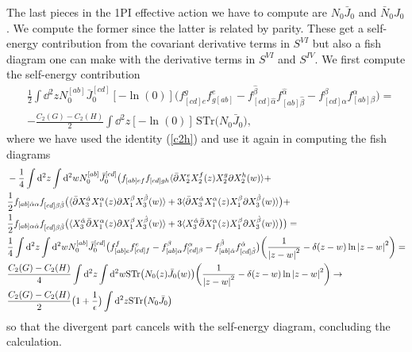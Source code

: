 \documentclass[12pt]{article}
\def\be{\begin{equation}}
\def\ee{\end{equation}}
\numberwithin{equation}{section}
\newcommand{\h}[1]{\hat{#1}}
\begin{document}
The last pieces in the 1PI effective action we have to compute are $N_0\bar{J}_0$ and $\bar{N}_0 J_0$. We compute the former since the latter is related by parity. These get a self-energy contribution from the covariant derivative terms in $S^{VI}$ but also a fish diagram one can make with the derivative terms in $S^{VI}$ and $S^{IV}$. We first compute the self-energy contribution
\be
\begin{aligned}
&\frac{1}{2}\int \dd^2z N_0^{[ab]}\bar{J}_0^{[cd]}[-\ln(0)]\big(f_{[cd]e}^g f^e_{g[ab]} - f_{[cd]\h{\alpha}}^{\h{\beta}} f_{[ab]\h{\beta}}^{\h{\alpha}} - f_{[cd]\alpha}^\beta f_{[ab]\beta}^\alpha\big) = \\
&-\frac{C_2(G)-C_2(H)}{2} \int \dd^2 z [-\ln(0)] \,\text{STr} \big(N_0 \bar{J}_0\big),
\end{aligned}
\ee
where we have used the identity (\ref{c2h}) and use it again in computing the fish diagrams
\be
\begin{aligned}
&-\frac{1}{4}\int \dd^2 z \int \dd^2 w N_0^{[ab]} \bar{J}_0^{[cd]} \big(f_{[ab]ef}f_{[cd]gh} \langle \bar{\partial} X_2^e X_2^f(z) X_2^g \partial X_2^h(w)\rangle + \\
& \frac{1}{2} f_{[ab]\h{\alpha}\alpha}f_{[cd]\beta \h{\beta}} \big(\langle \bar{\partial} X_3^{\h{\alpha} }X_1^\alpha(z) \partial X_1^\beta X_3^{\h{\beta}}(w)\rangle + 3 \langle \bar{\partial} X_3^{\h{\alpha}} X_1^\alpha(z) X_1^\beta \partial X_3^{\h{\beta}}(w)\rangle \big) + \\
&\frac{1}{2}  f_{[ab]\alpha\h{\alpha}}f_{[cd]\beta \h{\beta}} \big(\langle X_3^{\h{\alpha}}\bar{\partial}X_1^\alpha(z) \partial X_1^\beta X_3^{\h{\beta}}(w)\rangle + 3 \langle X_3^{\h{\alpha}}\bar{\partial}X_1^\alpha(z)  X_1^\beta\partial X_3^{\h{\beta}}(w)\rangle \big)\big) =\\
&\frac{1}{4} \int\dd^2 z \int \dd^2 w N_0^{[ab]} \bar{J}_0^{[cd]} \big(f_{[ab]e}^f f_{[cd]f}^e - f_{[ab]\alpha}^\beta f_{[cd]\beta}^\alpha - f_{[ab]\h{\alpha}}^{\h{\beta}} f_{[cd]\h{\beta}}^{\h{\alpha}}\big) \biggr(\frac{1}{\abs{z-w}^2} - \delta(z-w) \ln\abs{z-w}^2\biggr) = \\
&\frac{C_2(G)-C_2(H)}{4} \int \dd^2 z \int \dd^2 w \text{STr}\big(N_0(z) \bar{J}_0(w)\big) \biggr(\frac{1}{\abs{z-w}^2} - \delta(z-w) \ln\abs{z-w}^2\biggr) \to \\
&\frac{C_2(G)-C_2(H)}{2} \big(1 + \frac{1}{\epsilon}\big) \int \dd^2 z \text{STr}\big(N_0 \bar{J}_0\big)
\end{aligned}
\ee
so that the divergent part cancels with the self-energy diagram, concluding the calculation.
\end{document}
